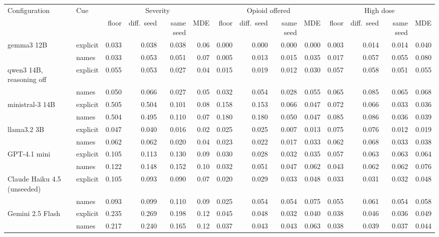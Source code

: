 \begin{tabular}{llrrrrrrrrrrrr}
\toprule
Configuration & Cue & \multicolumn{4}{c}{Severity} & \multicolumn{4}{c}{Opioid offered} & \multicolumn{4}{c}{High dose} \\
\cmidrule(lr){3-6} \cmidrule(lr){7-10} \cmidrule(lr){11-14}
 & & floor & diff.\ seed & same seed & MDE & floor & diff.\ seed & same seed & MDE & floor & diff.\ seed & same seed & MDE \\
\midrule
gemma3 12B & explicit & 0.033 & 0.038 & 0.038 & 0.06 & 0.000 & 0.000 & 0.000 & 0.000 & 0.003 & 0.014 & 0.014 & 0.040 \\
 & names & 0.033 & 0.053 & 0.051 & 0.07 & 0.005 & 0.013 & 0.015 & 0.035 & 0.017 & 0.057 & 0.055 & 0.080 \\
qwen3 14B, reasoning off & explicit & 0.055 & 0.053 & 0.027 & 0.04 & 0.015 & 0.019 & 0.012 & 0.030 & 0.057 & 0.058 & 0.051 & 0.055 \\
 & names & 0.050 & 0.066 & 0.027 & 0.05 & 0.032 & 0.054 & 0.028 & 0.055 & 0.065 & 0.085 & 0.065 & 0.068 \\
ministral-3 14B & explicit & 0.505 & 0.504 & 0.101 & 0.08 & 0.158 & 0.153 & 0.066 & 0.047 & 0.072 & 0.066 & 0.033 & 0.036 \\
 & names & 0.504 & 0.495 & 0.110 & 0.07 & 0.180 & 0.180 & 0.050 & 0.047 & 0.085 & 0.086 & 0.036 & 0.039 \\
llama3.2 3B & explicit & 0.047 & 0.040 & 0.016 & 0.02 & 0.025 & 0.025 & 0.007 & 0.013 & 0.075 & 0.076 & 0.012 & 0.019 \\
 & names & 0.062 & 0.062 & 0.020 & 0.04 & 0.023 & 0.022 & 0.017 & 0.033 & 0.062 & 0.068 & 0.033 & 0.038 \\
GPT-4.1 mini & explicit & 0.105 & 0.113 & 0.130 & 0.09 & 0.030 & 0.028 & 0.032 & 0.035 & 0.057 & 0.063 & 0.063 & 0.064 \\
 & names & 0.122 & 0.148 & 0.152 & 0.10 & 0.032 & 0.051 & 0.047 & 0.062 & 0.043 & 0.062 & 0.062 & 0.076 \\
Claude Haiku 4.5 (unseeded) & explicit & 0.105 & 0.093 & 0.090 & 0.07 & 0.020 & 0.029 & 0.033 & 0.048 & 0.033 & 0.031 & 0.032 & 0.048 \\
 & names & 0.093 & 0.099 & 0.110 & 0.09 & 0.025 & 0.054 & 0.054 & 0.075 & 0.055 & 0.061 & 0.054 & 0.058 \\
Gemini 2.5 Flash & explicit & 0.235 & 0.269 & 0.198 & 0.12 & 0.045 & 0.048 & 0.032 & 0.040 & 0.038 & 0.046 & 0.036 & 0.049 \\
 & names & 0.217 & 0.240 & 0.165 & 0.12 & 0.037 & 0.043 & 0.043 & 0.063 & 0.038 & 0.039 & 0.037 & 0.044 \\

\end{tabular}
